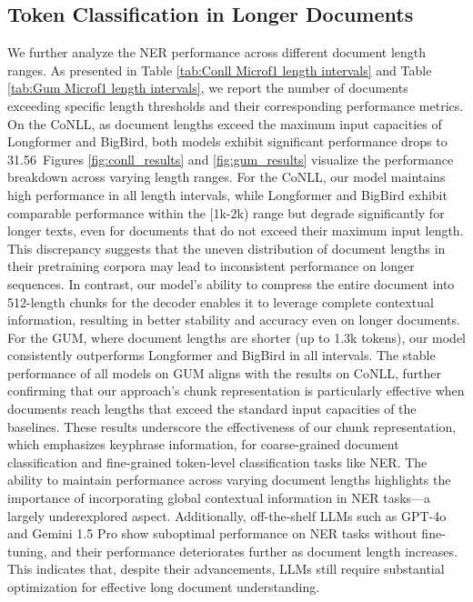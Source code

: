 \documentclass[11pt]{article}
\begin{document}
\subsection{Token Classification in Longer Documents}
We further analyze the NER performance across different document length ranges. As presented in Table \ref{tab:Conll Microf1 length intervals} and Table \ref{tab:Gum Microf1 length intervals}, we report the number of documents exceeding specific length thresholds and their corresponding performance metrics. On the CoNLL, as document lengths exceed the maximum input capacities of Longformer and BigBird, both models exhibit significant performance drops to 31.56\
Figures \ref{fig:conll_results} and \ref{fig:gum_results} visualize the performance breakdown across varying length ranges. For the CoNLL, our model maintains high performance in all length intervals, while Longformer and BigBird exhibit comparable performance within the [1k-2k) range but degrade significantly for longer texts, even for documents that do not exceed their maximum input length. This discrepancy suggests that the uneven distribution of document lengths in their pretraining corpora may lead to inconsistent performance on longer sequences. In contrast, our model’s ability to compress the entire document into 512-length chunks for the decoder enables it to leverage complete contextual information, resulting in better stability and accuracy even on longer documents.
For the GUM, where document lengths are shorter (up to 1.3k tokens), our model consistently outperforms Longformer and BigBird in all intervals. The stable performance of all models on GUM aligns with the results on CoNLL, further confirming that our approach’s chunk representation is particularly effective when documents reach lengths that exceed the standard input capacities of the baselines.
These results underscore the effectiveness of our chunk representation, which emphasizes keyphrase information, for coarse-grained document classification and fine-grained token-level classification tasks like NER. The ability to maintain performance across varying document lengths highlights the importance of incorporating global contextual information in NER tasks—a largely underexplored aspect. Additionally, off-the-shelf LLMs such as GPT-4o and Gemini 1.5 Pro show suboptimal performance on NER tasks without fine-tuning, and their performance deteriorates further as document length increases. This indicates that, despite their advancements, LLMs still require substantial optimization for effective long document understanding.
\end{document}
